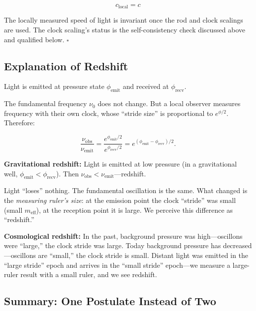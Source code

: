 \documentclass[11pt]{article}
\begin{document}
\begin{equation}
  \boxed{c_{\mathrm{local}} = c}
  \label{eq:c_invariant}
\end{equation}

The locally measured speed of light is invariant once the rod and
clock scalings are used.  The clock scaling's status is the
self-consistency check discussed above and qualified below. $\square$

\subsection{Explanation of Redshift}

Light is emitted at pressure state $\phi_{\mathrm{emit}}$ and
received at $\phi_{\mathrm{recv}}$.

The fundamental frequency $\nu_0$ does not change. But a local
observer measures frequency with their own clock, whose ``stride
size'' is proportional to $e^{\phi/2}$. Therefore:

\begin{equation}
  \frac{\nu_{\mathrm{obs}}}{\nu_{\mathrm{emit}}}
  = \frac{e^{\phi_{\mathrm{emit}}/2}}
         {e^{\phi_{\mathrm{recv}}/2}}
  = e^{(\phi_{\mathrm{emit}}-\phi_{\mathrm{recv}})/2}.
  \label{eq:redshift_freq}
\end{equation}

\textbf{Gravitational redshift:}
Light is emitted at low pressure (in a gravitational well,
$\phi_{\mathrm{emit}} < \phi_{\mathrm{recv}}$). Then
$\nu_{\mathrm{obs}} < \nu_{\mathrm{emit}}$---redshift.

Light ``loses'' nothing. The fundamental oscillation is the same.
What changed is the \emph{measuring ruler's size}: at the emission
point the clock ``stride'' was small (small $m_{\mathrm{eff}}$),
at the reception point it is large. We perceive this difference as
``redshift.''

\textbf{Cosmological redshift:}
In the past, background pressure was high---oscillons were
``large,'' the clock stride was large. Today background pressure
has decreased---oscillons are ``small,'' the clock stride is small.
Distant light was emitted in the ``large stride'' epoch and arrives
in the ``small stride'' epoch---we measure a large-ruler result
with a small ruler, and we see redshift.

\subsection{Summary: One Postulate Instead of Two}
\end{document}
